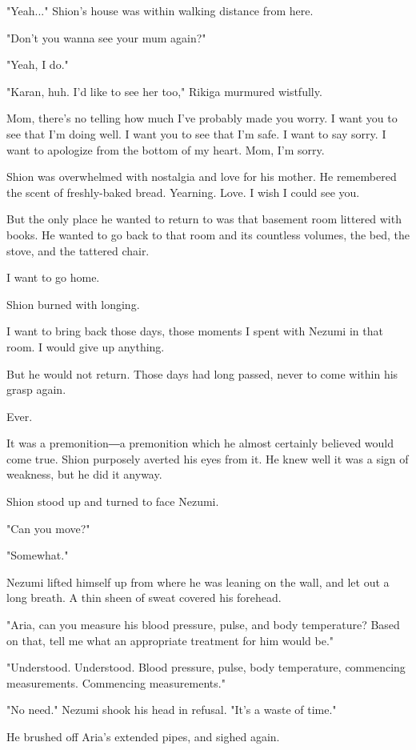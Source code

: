 "Yeah..." Shion's house was within walking distance from here.

"Don't you wanna see your mum again?"

"Yeah, I do."

"Karan, huh. I'd like to see her too," Rikiga murmured wistfully.

Mom, there's no telling how much I've probably made you worry. I want
you to see that I'm doing well. I want you to see that I'm safe. I want
to say sorry. I want to apologize from the bottom of my heart. Mom, I'm
sorry.

Shion was overwhelmed with nostalgia and love for his mother. He
remembered the scent of freshly-baked bread. Yearning. Love. I wish I
could see you.

But the only place he wanted to return to was that basement room
littered with books. He wanted to go back to that room and its countless
volumes, the bed, the stove, and the tattered chair.

I want to go home.

Shion burned with longing.

I want to bring back those days, those moments I spent with Nezumi in
that room. I would give up anything.

But he would not return. Those days had long passed, never to come
within his grasp again.

Ever.

It was a premonition―a premonition which he almost certainly believed
would come true. Shion purposely averted his eyes from it. He knew well
it was a sign of weakness, but he did it anyway.

Shion stood up and turned to face Nezumi.

"Can you move?"

"Somewhat."

Nezumi lifted himself up from where he was leaning on the wall, and let
out a long breath. A thin sheen of sweat covered his forehead.

"Aria, can you measure his blood pressure, pulse, and body temperature?
Based on that, tell me what an appropriate treatment for him would be."

"Understood. Understood. Blood pressure, pulse, body temperature,
commencing measurements. Commencing measurements."

"No need." Nezumi shook his head in refusal. "It's a waste of time."

He brushed off Aria's extended pipes, and sighed again.

